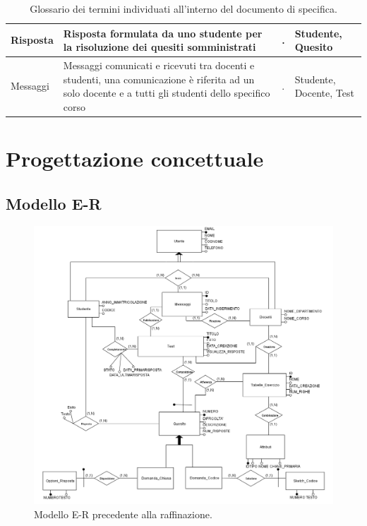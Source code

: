 \documentclass{article}
\begin{document}
\begin{table}[H]
\begin{tabularx}{\textwidth}{|X|p{6cm}|X|X|}
        \hline
        Risposta & Risposta formulata da uno studente per la risoluzione dei quesiti somministrati & . & Studente, Quesito \\
        \hline 
        Messaggi & Messaggi comunicati e ricevuti tra docenti e studenti, una comunicazione è riferita ad un solo docente e a tutti gli studenti dello specifico corso & . & Studente, Docente, Test \\
        \hline
    \end{tabularx}
    \caption{Glossario dei termini individuati all'interno del documento di specifica.}
\end{table}

\section{Progettazione concettuale}
\large
\subsection{Modello E-R}
\begin{figure}[H]
    \includegraphics[width=1\textwidth]{foto1.png}
    \caption{Modello E-R precedente alla raffinazione.}
\end{figure}
\end{document}
